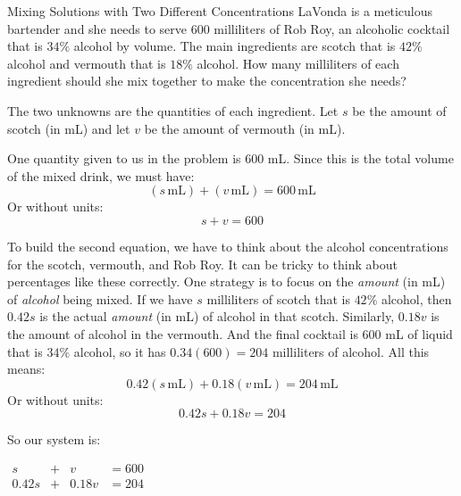 \documentclass[nooutcomes]{ximera}
\begin{document}
 \begin{example}{Mixing Solutions with Two Different Concentrations}
          LaVonda is a meticulous bartender and she needs to serve $600$ milliliters of Rob Roy,
          an alcoholic cocktail that is $34\%$ alcohol by volume.
          The main ingredients are scotch that is $42\%$ alcohol and vermouth that is $18\%$ alcohol.
          How many milliliters of each ingredient should she mix together to make the concentration she needs?
\begin{explanation}
          The two unknowns are the quantities of each ingredient.
          Let $s$ be the amount of scotch (in
         mL) and let $v$ be the amount of vermouth
          (in
        mL).
    


          One quantity given to us in the problem is     $600$ mL.
          Since this is the total volume of the mixed drink, we must have:
          $$
            (s\,\text{mL})+(v\,\text{mL})=600\,\text{mL}
        $$
          Or without units:
         $$
            s+v=600
        $$
      
          To build the second equation,
          we have to think about the alcohol concentrations for the scotch,
          vermouth,
          and Rob Roy.
          It can be tricky to think about percentages like these correctly.
          One strategy is to focus on the \textit{amount} (in
        mL) of \textit{alcohol} being mixed.
          If we have $s$ milliliters of scotch that is $42\%$ alcohol,
          then $0.42s$ is the actual \textit{amount} (in
       mL) of alcohol in that scotch.
          Similarly, $0.18v$ is the amount of alcohol in the vermouth.
          And the final cocktail is
          $600$ mL
          of liquid that is $34\%$ alcohol,
          so it has $0.34(600)=204$ milliliters of alcohol.
          All this means:
          $$
            0.42(s\,\text{mL})+0.18(v\,\text{mL})=204\,\text{mL}
          $$
          Or without units:
       $$
            0.42s+0.18v=204
         $$

      
          So our system is:
\begin{center}
$
            \begin{array}{cccc}
            s&+& v&=600 \\
            0.42s&+&0.18v&=204
            \end{array}
      $
\end{center}


\end{explanation}
\end{example}
\end{document}
